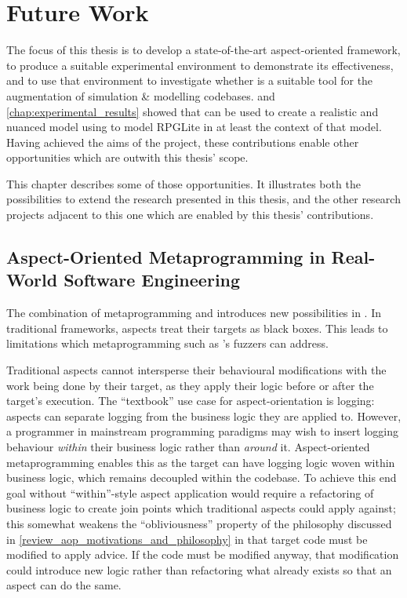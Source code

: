 \chapter{Future Work}\label{chap:future_work}

The focus of this thesis is to develop a state-of-the-art aspect-oriented
framework, to produce a suitable experimental environment to demonstrate its
effectiveness, and to use that environment to investigate whether
\aspectorientation{} is a suitable tool for the augmentation of simulation \&
modelling codebases.  and
\cref{chap:experimental_results} showed that \aspectorientation{} can be used to
create a realistic and nuanced model using \pdsfthree{} to model RPGLite in at
least the context of that model. Having achieved the aims of the project, these
contributions enable other opportunities which are outwith this thesis' scope.

This chapter describes some of those opportunities. It illustrates both the
possibilities to extend the research presented in this thesis, and the other
research projects adjacent to this one which are enabled by this thesis'
contributions.

\section{Aspect-Oriented Metaprogramming in Real-World Software Engineering}
\label{future_work_aspect_oriented_metaprogramming}

The combination of metaprogramming and \aspectorientation introduces new
possibilities in \aop{}. In traditional \aspectorientation frameworks, aspects
treat their targets as black boxes. This leads to limitations which
\aspectoriented{} metaprogramming such as \pdsfthree{}'s fuzzers can address.

Traditional aspects cannot intersperse their behavioural modifications with the
work being done by their target, as they apply their logic before or after the
target's execution. The ``textbook'' use case for aspect-orientation is logging:
aspects can separate logging from the business logic they are applied to.
However, a programmer in mainstream programming paradigms may wish to insert
logging behaviour \emph{within} their business logic rather than \emph{around}
it. Aspect-oriented metaprogramming enables this as the target can have logging
logic woven within business logic, which remains decoupled within the codebase.
To achieve this end goal without ``within''-style aspect application would
require a refactoring of business logic to create join points which traditional
aspects could apply against; this somewhat weakens the ``obliviousness'' property of the
\aspectoriented{} philosophy discussed in
\cref{review_aop_motivations_and_philosophy} in that target code must be modified
to apply advice. If the code must be modified anyway, that modification could
introduce new logic rather than refactoring what already exists so that an
aspect can do the same. 

